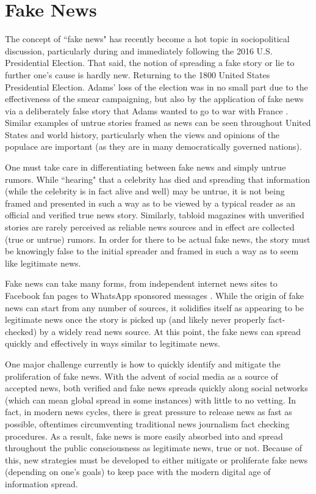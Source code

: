 \section{Fake News}
The concept of ``fake news" has recently become a hot topic in sociopolitical discussion, particularly during and immediately following the 2016 U.S. Presidential Election. That said, the notion of spreading a fake story or lie to further one's cause is hardly new. Returning to the 1800 United States Presidential Election. Adams' loss of the election was in no small part due to the effectiveness of the smear campaigning, but also by the application of fake news via a deliberately false story that Adams wanted to go to war with France \cite{cnnffcampaign}. Similar examples of untrue stories framed as news can be seen throughout United States and world history, particularly when the views and opinions of the populace are important (as they are in many democratically governed nations).

One must take care in differentiating between fake news and simply untrue rumors. While ``hearing" that a celebrity has died and spreading that information (while the celebrity is in fact alive and well) may be untrue, it is not being framed and presented in such a way as to be viewed by a typical reader as an official and verified true news story. Similarly, tabloid magazines with unverified stories are rarely perceived as reliable news sources and in effect are collected (true or untrue) rumors. In order for there to be actual fake news, the story must be knowingly false to the initial spreader and framed in such a way as to seem like legitimate news. 

Fake news can take many forms, from independent internet news sites to Facebook fan pages to WhatsApp sponsored messages \cite{whatsapp2017}. While the origin of fake news can start from any number of sources, it solidifies itself as appearing to be legitimate news once the story is picked up (and likely never properly fact-checked) by a widely read news source. At this point, the fake news can spread quickly and effectively in ways similar to legitimate news. 

One major challenge currently is how to quickly identify and mitigate the proliferation of fake news. With the advent of social media as a source of accepted news, both verified and fake news spreads quickly along social networks (which can mean global spread in some instances) with little to no vetting. In fact, in modern news cycles, there is great pressure to release news as fast as possible, oftentimes circumventing traditional news journalism fact checking procedures. As a result, fake news is more easily absorbed into and spread throughout the public consciousness as legitimate news, true or not. Because of this, new strategies must be developed to either mitigate or proliferate fake news (depending on one's goals) to keep pace with the modern digital age of information spread.